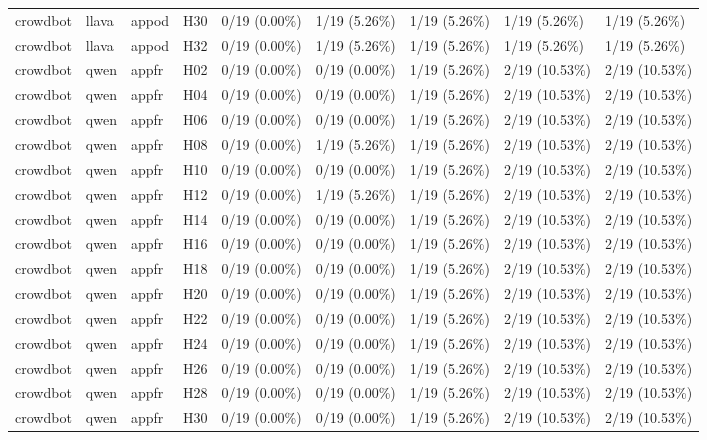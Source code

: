 \begin{longtable}{lllllllll}
crowdbot & llava & appod & H30 & 0/19 (0.00\%) & 1/19 (5.26\%) & 1/19 (5.26\%) & 1/19 (5.26\%) & 1/19 (5.26\%) \\
crowdbot & llava & appod & H32 & 0/19 (0.00\%) & 1/19 (5.26\%) & 1/19 (5.26\%) & 1/19 (5.26\%) & 1/19 (5.26\%) \\
crowdbot & qwen & appfr & H02 & 0/19 (0.00\%) & 0/19 (0.00\%) & 1/19 (5.26\%) & 2/19 (10.53\%) & 2/19 (10.53\%) \\
crowdbot & qwen & appfr & H04 & 0/19 (0.00\%) & 0/19 (0.00\%) & 1/19 (5.26\%) & 2/19 (10.53\%) & 2/19 (10.53\%) \\
crowdbot & qwen & appfr & H06 & 0/19 (0.00\%) & 0/19 (0.00\%) & 1/19 (5.26\%) & 2/19 (10.53\%) & 2/19 (10.53\%) \\
crowdbot & qwen & appfr & H08 & 0/19 (0.00\%) & 1/19 (5.26\%) & 1/19 (5.26\%) & 2/19 (10.53\%) & 2/19 (10.53\%) \\
crowdbot & qwen & appfr & H10 & 0/19 (0.00\%) & 0/19 (0.00\%) & 1/19 (5.26\%) & 2/19 (10.53\%) & 2/19 (10.53\%) \\
crowdbot & qwen & appfr & H12 & 0/19 (0.00\%) & 1/19 (5.26\%) & 1/19 (5.26\%) & 2/19 (10.53\%) & 2/19 (10.53\%) \\
crowdbot & qwen & appfr & H14 & 0/19 (0.00\%) & 0/19 (0.00\%) & 1/19 (5.26\%) & 2/19 (10.53\%) & 2/19 (10.53\%) \\
crowdbot & qwen & appfr & H16 & 0/19 (0.00\%) & 0/19 (0.00\%) & 1/19 (5.26\%) & 2/19 (10.53\%) & 2/19 (10.53\%) \\
crowdbot & qwen & appfr & H18 & 0/19 (0.00\%) & 0/19 (0.00\%) & 1/19 (5.26\%) & 2/19 (10.53\%) & 2/19 (10.53\%) \\
crowdbot & qwen & appfr & H20 & 0/19 (0.00\%) & 0/19 (0.00\%) & 1/19 (5.26\%) & 2/19 (10.53\%) & 2/19 (10.53\%) \\
crowdbot & qwen & appfr & H22 & 0/19 (0.00\%) & 0/19 (0.00\%) & 1/19 (5.26\%) & 2/19 (10.53\%) & 2/19 (10.53\%) \\
crowdbot & qwen & appfr & H24 & 0/19 (0.00\%) & 0/19 (0.00\%) & 1/19 (5.26\%) & 2/19 (10.53\%) & 2/19 (10.53\%) \\
crowdbot & qwen & appfr & H26 & 0/19 (0.00\%) & 0/19 (0.00\%) & 1/19 (5.26\%) & 2/19 (10.53\%) & 2/19 (10.53\%) \\
crowdbot & qwen & appfr & H28 & 0/19 (0.00\%) & 0/19 (0.00\%) & 1/19 (5.26\%) & 2/19 (10.53\%) & 2/19 (10.53\%) \\
crowdbot & qwen & appfr & H30 & 0/19 (0.00\%) & 0/19 (0.00\%) & 1/19 (5.26\%) & 2/19 (10.53\%) & 2/19 (10.53\%) \\

\end{longtable}
